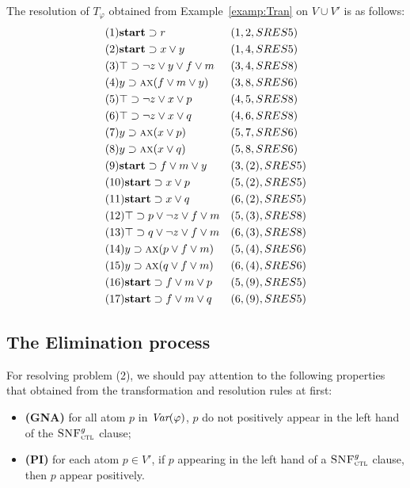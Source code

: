 \documentclass[letterpaper]{article} %
\begin{document}
\begin{example}\label{examp:Res}
The resolution of $T_{\varphi}$ obtained from Example~\ref{examp:Tran} on $V\cup V'$ is as follows:
\begin{align*}
&(1) \textbf{start} \supset r && (1,2,SRES 5)\\
&(2) \textbf{start} \supset x \vee y && (1,4,SRES 5)\\
&(3) \top \supset \neg z \vee y \vee f \vee m && (3, 4, SRES 8)\\
&(4) y \supset \textsc{a}\textsc{x}(f\vee m\vee y) && (3,8, SRES 6)\\
&(5) \top \supset \neg z \vee x \vee p && (4,5, SRES 8)\\
&(6) \top \supset \neg z \vee x \vee q && (4,6, SRES 8)\\
&(7) y \supset \textsc{a}\textsc{x}(x\vee p) && (5, 7, SRES 6)\\
&(8) y \supset \textsc{a}\textsc{x}(x\vee q) && (5, 8, SRES 6)\\
&(9) \textbf{start} \supset f\vee m \vee y && (3,(2), SRES 5) \\
&(10) \textbf{start} \supset x \vee p && (5,(2),SRES 5) \\
&(11) \textbf{start} \supset x \vee q && (6,(2), SRES 5) \\
&(12) \top \supset p \vee \neg z \vee f \vee m && (5,(3), SRES 8)\\
&(13) \top \supset q \vee \neg z \vee f \vee m && (6,(3), SRES 8)\\
&(14) y \supset \textsc{a}\textsc{x}(p \vee f\vee m) && (5, (4), SRES 6) \\
&(15) y \supset \textsc{a}\textsc{x}(q \vee f\vee m) && (6, (4), SRES 6) \\
&(16) \textbf{start} \supset f\vee m \vee p && (5, (9), SRES 5) \\
&(17) \textbf{start} \supset f\vee m \vee q && (6, (9), SRES 5)
\end{align*}
\end{example}

\subsection{The Elimination process}
For resolving problem (2), we should pay attention to the following properties that obtained from the transformation and resolution rules at first:
\begin{itemize}
  \item \textbf{(GNA)} for all atom $p$ in $\textit{Var}(\varphi)$, $p$ do not positively appear in the left hand of the ${\textsc{SNF}_{\textsc{ctl}}^g}$ clause;
  \item \textbf{(PI)} for each atom $p\in V'$, if $p$ appearing in the left hand of a ${\textsc{SNF}_{\textsc{ctl}}^g}$ clause, then $p$ appear positively.
\end{itemize}
\end{document}
